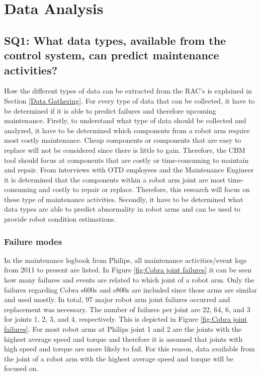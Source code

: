 \chapter{Data Analysis} \label{Chapter5}

\section{SQ1: What data types, available from the control system, can predict maintenance activities?} \label{SQ1}
How the different types of data can be extracted from the RAC's is explained in Section \ref{Data Gathering}. For every type of data that can be collected, it have to be determined if it is able to predict failures and therefore upcoming maintenance. Firstly, to understand what type of data should be collected and analyzed, it have to be determined which components from a robot arm require most costly maintenance. Cheap components or components that are easy to replace will not be considered since there is little to gain. Therefore, the CBM tool should focus at components that are costly or time-consuming to maintain and repair. From interviews with OTD employees and the Maintenance Engineer it is determined that the components within a robot arm joint are most time-consuming and costly to repair or replace. Therefore, this research will focus on these type of maintenance activities. Secondly, it have to be determined what data types are able to predict abnormality in robot arms and can be used to provide robot condition estimations. 

\subsection{Failure modes} \label{Failure modes}
In the maintenance logbook from Philips, all maintenance activities/event logs from 2011 to present are listed. In Figure \ref{fig:Cobra joint failures} it can be seen how many failures and events are related to which joint of a robot arm. Only the failures regarding Cobra s600s and s800s are included since those arms are similar and used mostly. In total, 97 major robot arm joint failures occurred and replacement was necessary. The number of failures per joint are 22, 64, 6, and 3 for joints 1, 2, 3, and 4, respectively. This is depicted in Figure \ref{fig:Cobra joint failures}. For most robot arms at Philips joint 1 and 2 are the joints with the highest average speed and torque and therefore it is assumed that joints with high speed and torque are more likely to fail. For this reason, data available from the joint of a robot arm with the highest average speed and torque will be focused on. 

